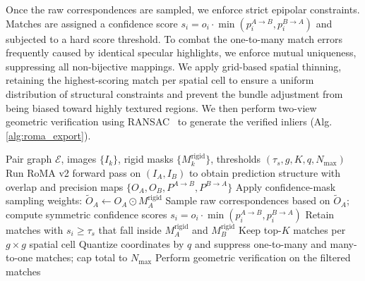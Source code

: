 \documentclass[letterpaper, 10 pt, conference]{ieeeconf}  %
\begin{document}
Once the raw correspondences are sampled, we enforce strict epipolar constraints. Matches are assigned a confidence score $s_i = o_i \cdot \min(p^{A\rightarrow B}_i, p^{B\rightarrow A}_i)$ and subjected to a hard score threshold. To combat the one-to-many match errors frequently caused by identical specular highlights, we enforce mutual uniqueness, suppressing all non-bijective mappings. We apply grid-based spatial thinning, retaining the highest-scoring match per spatial cell to ensure a uniform distribution of structural constraints and prevent the bundle adjustment from being biased toward highly textured regions. We then perform two-view geometric verification using RANSAC~\cite{fischler1981random} to generate the verified inliers (Alg. \ref{alg:roma_export}).






\begin{algorithm}[t]
\caption{Motion- and Mask-Aware RoMA v2 Matching}
\label{alg:roma_export}
\begin{algorithmic}[1]
\REQUIRE Pair graph $\mathcal{E}$, images $\{I_k\}$, rigid masks $\{M^{\text{rigid}}_k\}$, thresholds $(\tau_s, g, K, q, N_{\max})$
    \STATE Run RoMA v2 forward pass on $(I_A, I_B)$ to obtain prediction structure with overlap and precision maps $\{O_A, O_B, P^{A\rightarrow B}, P^{B\rightarrow A}\}$
    \STATE Apply confidence-mask sampling weights: $\tilde{O}_A \leftarrow O_A \odot M^{\text{rigid}}_A$
    \STATE Sample raw correspondences based on $\tilde{O}_A$; compute symmetric confidence scores $s_i = o_i \cdot \min(p^{A\rightarrow B}_i, p^{B\rightarrow A}_i)$
    \STATE Retain matches with $s_i \geq \tau_s$ that fall inside $M^{\text{rigid}}_A$ and $M^{\text{rigid}}_B$
    \STATE Keep top-$K$ matches per $g \times g$ spatial cell
    \STATE Quantize coordinates by $q$ and suppress one-to-many and many-to-one matches; cap total to $N_{\max}$
\ENDFOR
\STATE Perform geometric verification on the filtered matches
\end{algorithmic}
\end{algorithm}
\end{document}
